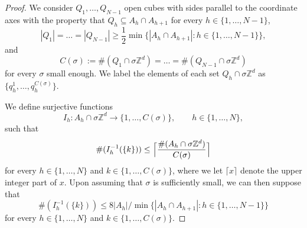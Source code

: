 \documentclass[10pt,a4paper]{amsart}
\def\ZZ{{\mathbb Z}}
\newcommand{\s}{\sigma}
\begin{document}
\begin{proof}
We consider $Q_1,\dots, Q_{N-1}$ open cubes with sides parallel to the coordinate axes with the property that $Q_h\subseteq A_h\cap A_{h+1}$ for every $h\in\{1,\dots, N-1\}$,
\begin{equation*}
   |Q_1|=\dots= |Q_{N-1}|\geq \frac{1}{2}\min\{|A_h\cap A_{h+1}| :  h\in\{1,\dots, N-1\}\}, 
\end{equation*}
and 
\begin{equation*}
   C(\s):= \#(Q_1\cap \s\ZZ^d)=\dots = \#(Q_{N-1}\cap \s\ZZ^d)
\end{equation*}
for every $\s$ small enough. We label the elements of each set $Q_h\cap \s\ZZ^d$ as $\{q_h^1,\dots, q_h^{C(\s)}\}$.

We define surjective functions
\begin{equation*}
   I_{h}: A_h\cap\s\mathbb Z^d \to \{1,\dots, C(\s)\}, \qquad h\in\{1,\dots,N\},
\end{equation*}
such that
\begin{equation*}
    \#(I_h^{-1}(\{k\})) \leq \Bigl\lceil\frac{\#(A_{h}\cap \s \mathbb Z^d)}{C(\s)}\Bigr\rceil
\end{equation*}
for every $h\in\{1,\dots,N\}$ and $k\in\{1,\dots, C(\s)\}$, where we let $\lceil x\rceil$ denote the upper integer part of $x$. Upon assuming that $\s$ is sufficiently small, we can then suppose that
\begin{equation}\label{stima cardinalità}
    \#(I_h^{-1}(\{k\})) \leq 8|A_h|/\min\{|A_h\cap A_{h+1}| :  h\in\{1,\dots, N-1\}\} 
\end{equation}
for every $h\in\{1,\dots,N\}$ and $k\in\{1,\dots, C(\s)\}$. 


\end{proof}
\end{document}
